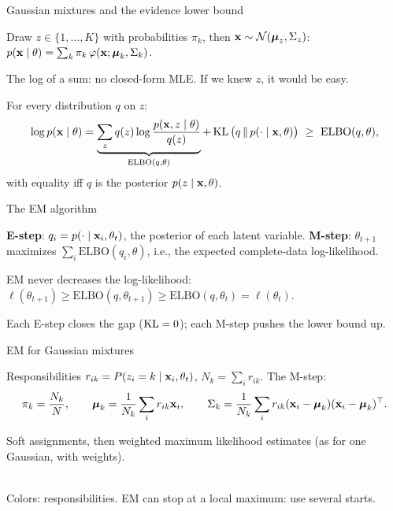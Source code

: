 \documentclass[aspectratio=1610,11pt]{beamer}
\begin{document}
\begin{frame}{Gaussian mixtures and the evidence lower bound}
    \begin{definition}
        \small Draw $z \in \{1, \ldots, K\}$ with probabilities $\pi_k$, then $\mathbf{x} \sim \mathcal{N}(\boldsymbol\mu_z, \Sigma_z)$: \ $p(\mathbf{x} \mid \theta) = \sum_k\pi_k\,\varphi(\mathbf{x}; \boldsymbol\mu_k, \Sigma_k)$.
    \end{definition}
    \small The log of a sum: no closed-form MLE. If we knew $z$, it would be easy.
    \begin{theorem}
        \small For every distribution $q$ on $z$:
        \[\log p(\mathbf{x} \mid \theta) = \underbrace{\sum_zq(z)\log\frac{p(\mathbf{x}, z \mid \theta)}{q(z)}}_{\mathrm{ELBO}(q, \theta)} + \operatorname{KL}\big(q \,\|\, p(\cdot \mid \mathbf{x}, \theta)\big) \ \geq\ \mathrm{ELBO}(q, \theta),\]
        with equality iff $q$ is the posterior $p(z \mid \mathbf{x}, \theta)$.
    \end{theorem}
\end{frame}


\begin{frame}{The EM algorithm}
    \begin{definition}[EM][def:em]
        \small \textbf{E-step}: $q_i = p(\cdot \mid \mathbf{x}_i, \theta_t)$, the posterior of each latent variable. \textbf{M-step}: $\theta_{t+1}$ maximizes $\sum_i\mathrm{ELBO}(q_i, \theta)$, i.e., the expected complete-data log-likelihood.
    \end{definition}
    \begin{theorem}
        \small EM never decreases the log-likelihood: $\ell(\theta_{t+1}) \geq \mathrm{ELBO}(q, \theta_{t+1}) \geq \mathrm{ELBO}(q, \theta_t) = \ell(\theta_t)$.
    \end{theorem}
    \small Each E-step closes the gap ($\operatorname{KL} = 0$); each M-step pushes the lower bound up.
\end{frame}

\begin{frame}{EM for Gaussian mixtures}
    \begin{theorem}
        \small Responsibilities $r_{ik} = P(z_i = k \mid \mathbf{x}_i, \theta_t)$, $N_k = \sum_ir_{ik}$. The M-step:
        \[\pi_k = \frac{N_k}{N}, \qquad \boldsymbol\mu_k = \frac{1}{N_k}\sum_ir_{ik}\mathbf{x}_i, \qquad \Sigma_k = \frac{1}{N_k}\sum_ir_{ik}(\mathbf{x}_i - \boldsymbol\mu_k)(\mathbf{x}_i - \boldsymbol\mu_k)^\top.\]
    \end{theorem}
    \small Soft assignments, then weighted maximum likelihood estimates (as for one Gaussian, with weights).
    \\[0.3em]
    \centering{}
    \\[0.1em]
    \raggedright\small Colors: responsibilities. EM can stop at a local maximum: use several starts.
\end{frame}
\end{document}
